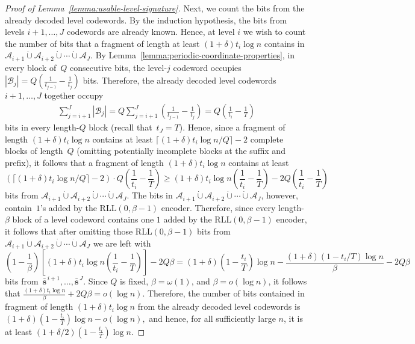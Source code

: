 \documentclass[journal,letterpaper,onecolumn,11pt]{IEEEtran}
\newcommand{\cA}{\mathcal{A}}
\newcommand{\cB}{\mathcal{B}}
\newcommand{\cC}{\mathcal{C}}
\newcommand{\bolds}{\mathbf{s}}
\begin{document}
\begin{proof}[Proof of Lemma~\ref{lemma:usable-level-signature}]
Next, we count the bits from the already decoded level codewords.
By the induction hypothesis, the bits from levels \(i+1,\ldots,J\) codewords are already known. 
Hence, at level \(i\) we wish to count the number of bits that a fragment of length at least
\((1+\delta)t_i\log n\) contains in 
$\cA_{i+1}\mathbin{\dot\cup}\cA_{i+2}
\mathbin{\dot\cup}\cdots\mathbin{\dot\cup}\cA_J.$
By Lemma~\ref{lemma:periodic-coordinate-properties}, in every block of~\(Q\) consecutive bits, the level-\(j\) codeword occupies
$|\cB_j|=Q\left(\frac{1}{t_{j-1}}-\frac{1}{t_j}\right)$
bits. 
Therefore, the already decoded level codewords
\(i+1,\ldots,J\) together occupy
\begin{align*}
\sum_{j=i+1}^{J}|\cB_j|
=
Q\sum_{j=i+1}^{J}
\left(\frac{1}{t_{j-1}}-\frac{1}{t_j}\right) 
=
Q\left(\frac{1}{t_i}-\frac{1}{T}\right)
\label{eq:recycled-bits-per-Q-block}
\end{align*}
bits in every length-\(Q\) block (recall that~\(t_J=T\)).
Hence, since a fragment of
length \((1+\delta)t_i\log n\) contains at least
$\lceil(1+\delta)t_i\log n/Q\rceil-2$ complete blocks of length~$Q$ (omitting potentially incomplete blocks at the suffix and prefix), it follows that a fragment of
length \((1+\delta)t_i\log n\) contains at least  $$\left(\lceil(1+\delta)t_i\log n/Q\rceil-2\right)\cdot Q\left(\frac{1}{t_i}-\frac{1}{T}\right)\ge(1+\delta)t_i\log n\left(\frac{1}{t_i}-\frac{1}{T}\right)-2Q\left(\frac{1}{t_i}-\frac{1}{T}\right)$$ bits from  $\cA_{i+1}\mathbin{\dot\cup}\cA_{i+2}
\mathbin{\dot\cup}\cdots\mathbin{\dot\cup}\cA_J$.
The bits in $\cA_{i+1}\mathbin{\dot\cup}\cA_{i+2}
\mathbin{\dot\cup}\cdots\mathbin{\dot\cup}\cA_J$, however, contain~$1$'s added by the \(\mathrm{RLL}(0,\beta-1)\) encoder. 
Therefore, since every length-\(\beta\) block of a level codeword
contains one \(1\) added by the
\(\mathrm{RLL}(0,\beta-1)\) encoder, it follows that after omitting those \(\mathrm{RLL}(0,\beta-1)\) bits from $\cA_{i+1}\mathbin{\dot\cup}\cA_{i+2}
\mathbin{\dot\cup}\cdots\mathbin{\dot\cup}\cA_J$ we are left with
\[
\left(1-\frac{1}{\beta}\right)
\left[
(1+\delta)t_i\log n
\left(\frac{1}{t_i}-\frac{1}{T}\right)
\right]
-2Q\beta=
(1+\delta)
\left(1-\frac{t_i}{T}\right)\log n
-
\frac{(1+\delta)(1-t_i/T)\log n}{\beta}-2Q\beta
\]
bits from~$\bar{\bolds}^{\,i+1},\ldots,\bar{\bolds}^{\,J}$.
Since \(Q\) is fixed, \(\beta=\omega(1)\), and
\(\beta=o(\log n)\), it follows that \(\frac{(1+\delta)t_i\log n}{\beta}+2Q\beta=o(\log n)\).
Therefore, the number of bits contained in fragment of
length \((1+\delta)t_i\log n\) from the already decoded level
codewords is
$(1+\delta)\left(1-\frac{t_i}{T}\right)\log n-o(\log n),$
and hence, for all sufficiently large \(n\), it is at least
$(1+\delta/2)\left(1-\frac{t_i}{T}\right)\log n$.


\end{proof}
\end{document}
